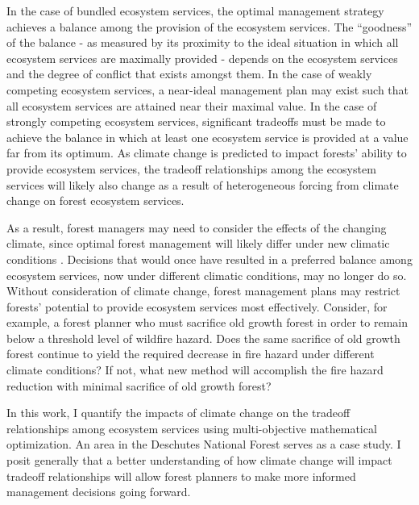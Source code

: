 In the case of bundled ecosystem services, the optimal management strategy achieves a balance among the provision of the ecosystem services. The ``goodness'' of the balance - as measured by its proximity to the ideal situation in which all ecosystem services are maximally provided - depends on the ecosystem services and the degree of conflict that exists amongst them. In the case of weakly competing ecosystem services, a near-ideal management plan may exist such that all ecosystem services are attained near their maximal value. In the case of strongly competing ecosystem services, significant tradeoffs must be made to achieve the balance in which at least one ecosystem service is provided at a value far from its optimum. As climate change is predicted to impact forests' ability to provide ecosystem services, the tradeoff relationships among the ecosystem services will likely also change as a result of heterogeneous forcing from climate change on forest ecosystem services.

As a result, forest managers may need to consider the effects of the changing climate, since %
optimal forest management will likely differ under new climatic conditions \cite{linder2000developing}. Decisions that would once have resulted in a preferred balance among ecosystem services, now under different climatic conditions, may no longer do so. Without consideration of climate change, forest management plans may restrict forests' potential to provide ecosystem services most effectively. Consider, for example, a forest planner who must sacrifice old growth forest in order to remain below a threshold level of wildfire hazard. Does the same sacrifice of old growth forest continue to yield the required decrease in fire hazard under different climate conditions? If not, what new method will accomplish the fire hazard reduction with minimal sacrifice of old growth forest?

In this work, I quantify the impacts of climate change on the tradeoff relationships among ecosystem services using multi-objective mathematical optimization. An area in the Deschutes National Forest serves as a case study. I posit generally that a better understanding of how climate change will impact tradeoff relationships will allow forest planners to make more informed management decisions going forward.

